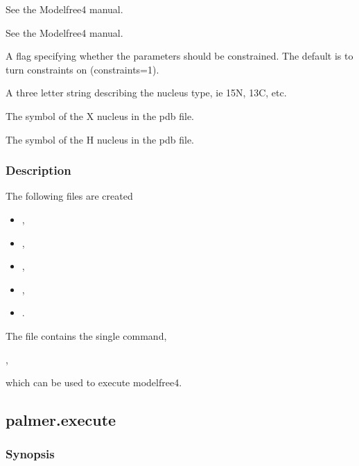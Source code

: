   See the Modelfree4 manual. 

  See the Modelfree4 manual. 

  A flag specifying whether the parameters should be constrained.  The default is to turn constraints on (constraints=1). 

  A three letter string describing the nucleus type, ie 15N, 13C, etc. 

  The symbol of the X nucleus in the pdb file. 

  The symbol of the H nucleus in the pdb file. 




\subsubsection{Description}

The following files are created


\begin{itemize}
\item[] , 
\item[] , 
\item[] , 
\item[] , 
\item[] . 
\end{itemize}


The file  contains the single command,


,


which can be used to execute modelfree4.




\newpage

\subsection{palmer.execute}


\subsubsection{Synopsis}

